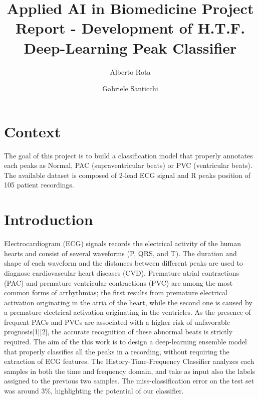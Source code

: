 \documentclass[conference]{IEEEtran}
\begin{document}
\title{Applied AI in Biomedicine Project Report - Development of H.T.F. Deep-Learning Peak Classifier   }

\author{
Alberto Rota
\and
Gabriele Santicchi 
}

\maketitle
\section{Context}
    The goal of this project is to build a classification model that properly 
    annotates each peaks as Normal, PAC (supraventricular beats) or PVC (ventricular beats).
    The available dataset is composed of 2-lead ECG signal and R peaks position of  
    105 patient recordings.  
\section{Introduction}
    Electrocardiogram (ECG) signals records the electrical activity of the human hearts 
    and consist of several waveforms (P, QRS, and T). The duration and shape of each 
    waveform and the distances between different peaks are used to diagnose cardiovascular heart
    diseases (CVD). Premature atrial contractions (PAC) and premature ventricular contractions (PVC) are among 
    the most common forms of arrhythmias; the first results from premature electrical activation 
    originating in the atria of the heart, while the second one is caused by a premature 
    electrical activation originating in the ventricles.
    As the presence of frequent PACs and PVCs are associated with a higher risk of unfavorable prognosis[1][2], 
    the accurate recognition of these abnormal beats is strictly required. 
    The aim of the this work is to design a deep-learning ensemble model that properly classifies
    all the peaks in a recording, without requiring the extraction of ECG features. 
    The History-Time-Frequency Classifier analyzes each samples in both the time and frequency domain, and take as input also the 
    labels assigned to the previous two samples. 
    The miss-classification error on the test set was around 3\%, highlighting the potential of our classifier. 
\end{document}
